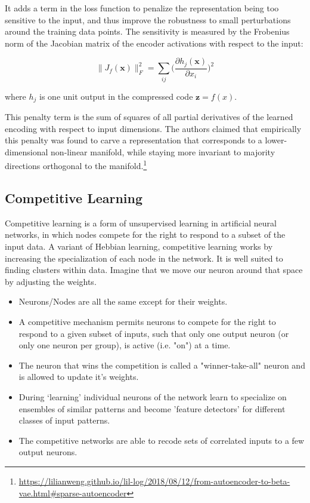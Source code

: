 \documentclass[main]{subfiles}
\begin{document}
It adds a term in the loss function to penalize the representation being too sensitive to the input, and thus improve the robustness to small perturbations around the training data points. The sensitivity is measured by the Frobenius norm of the Jacobian matrix of the encoder activations with respect to the input:

\begin{equation}
    \|J_f(\mathbf{x})\|_F^2 = \sum_{ij} \Big( \frac{\partial h_j(\mathbf{x})}{\partial x_i} \Big)^2
\end{equation}

where $h_j$ is one unit output in the compressed code $\mathbf{z} = f(x)$.

This penalty term is the sum of squares of all partial derivatives of the learned encoding with respect to input dimensions. The authors claimed that empirically this penalty was found to carve a representation that corresponds to a lower-dimensional non-linear manifold, while staying more invariant to majority directions orthogonal to the manifold.\footnote{\url{https://lilianweng.github.io/lil-log/2018/08/12/from-autoencoder-to-beta-vae.html#sparse-autoencoder}}
\subsection{Competitive Learning}
Competitive learning is a form of unsupervised learning in artificial neural networks, in which nodes compete for the right to respond to a subset of the input data. A variant of Hebbian learning, competitive learning works by increasing the specialization of each node in the network. It is well suited to finding clusters within data. Imagine that we move our neuron around that space by adjusting the weights.

\begin{itemize}
    \item Neurons/Nodes are all the same except for their weights.
    \item A competitive mechanism permits neurons to compete for the right to respond to a given subset of inputs, such that only one output neuron (or only one neuron per group), is active (i.e. "on") at a time.
    \item The neuron that wins the competition is called a "winner-take-all" neuron and is allowed to update it’s weights.
    \item During ‘learning’ individual neurons of the network learn to specialize on ensembles of similar patterns and become 'feature detectors' for different classes of input patterns.
    \item The competitive networks are able to recode sets of correlated inputs to a few output neurons.
\end{itemize}
\end{document}
